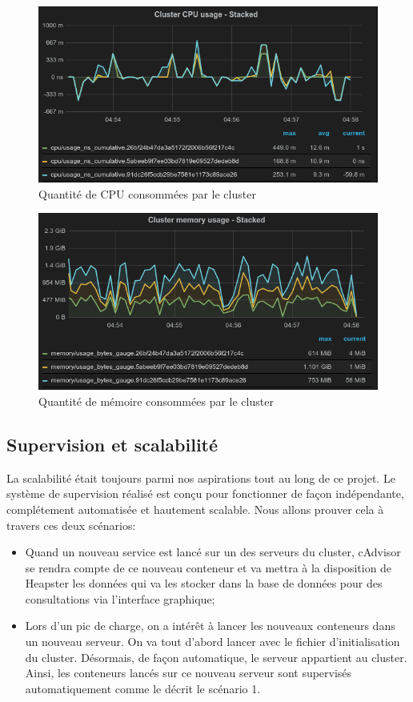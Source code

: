 \begin{onehalfspace}
\begin{figure}[H]
\centering
\includegraphics [scale=0.6]{chapitre5/assets/cluster-cpu}
\caption{Quantité de CPU consommées par le cluster}
\label{fig:}
\end{figure}

\begin{figure}[H]
\centering
\includegraphics [scale=0.6]{chapitre5/assets/cluster-memory}
\caption{Quantité de mémoire consommées par le cluster}
\label{fig:}
\end{figure}


\subsection{Supervision et scalabilité}

La scalabilité était toujours parmi nos aspirations tout au long de ce projet. Le système de supervision réalisé est conçu pour fonctionner de façon indépendante, complétement automatisée et hautement scalable. Nous allons prouver cela à travers ces deux scénarios:

\begin{itemize}
	\item Quand un nouveau service est lancé sur un des serveurs du cluster, cAdvisor se rendra compte de ce nouveau conteneur et va mettra à la disposition de Heapster les données qui va les stocker dans la base de données pour des consultations via l'interface graphique;
	\item Lors d'un pic de charge, on a intérêt à lancer les nouveaux conteneurs dans un nouveau serveur. On va tout d'abord lancer avec le fichier d'initialisation du cluster. Désormais, de façon automatique, le serveur appartient au cluster. Ainsi, les conteneurs lancés sur ce nouveau serveur sont supervisés automatiquement comme le décrit le scénario 1.
\end{itemize}


\end{onehalfspace}
